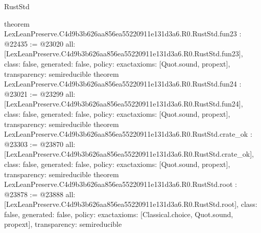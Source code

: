 \begin{lexlean}{RustStd}
\begin{coremodule}
{}
theorem LexLeanPreserve.C4d9b3b626aa856ea55220911e131d3a6.R0.RustStd.fun23 : @22435 := @23020 {
  all: [LexLeanPreserve.C4d9b3b626aa856ea55220911e131d3a6.R0.RustStd.fun23],
  class: false,
  generated: false,
  policy: exact{axioms: [Quot.sound, propext]},
  transparency: semireducible
}
theorem LexLeanPreserve.C4d9b3b626aa856ea55220911e131d3a6.R0.RustStd.fun24 : @23021 := @23299 {
  all: [LexLeanPreserve.C4d9b3b626aa856ea55220911e131d3a6.R0.RustStd.fun24],
  class: false,
  generated: false,
  policy: exact{axioms: [Quot.sound, propext]},
  transparency: semireducible
}
theorem LexLeanPreserve.C4d9b3b626aa856ea55220911e131d3a6.R0.RustStd.crate_ok : @23303 := @23870 {
  all: [LexLeanPreserve.C4d9b3b626aa856ea55220911e131d3a6.R0.RustStd.crate_ok],
  class: false,
  generated: false,
  policy: exact{axioms: [Quot.sound, propext]},
  transparency: semireducible
}
theorem LexLeanPreserve.C4d9b3b626aa856ea55220911e131d3a6.R0.RustStd.root : @23878 := @23888 {
  all: [LexLeanPreserve.C4d9b3b626aa856ea55220911e131d3a6.R0.RustStd.root],
  class: false,
  generated: false,
  policy: exact{axioms: [Classical.choice, Quot.sound, propext]},
  transparency: semireducible
}


\end{coremodule}
\end{lexlean}
